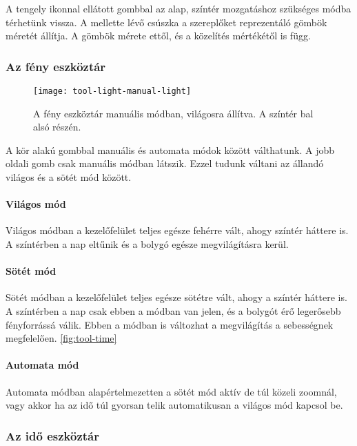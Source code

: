 A tengely ikonnal ellátott gombbal az alap, színtér mozgatáshoz szükséges módba térhetünk vissza. A mellette lévő csúszka a szereplőket reprezentáló gömbök méretét állítja. A gömbök mérete ettől, és a közelítés mértékétől is függ.

\subsubsection{Az fény eszköztár}

\begin{figure}[h!]
	\centering
	\texttt{[image: tool-light-manual-light]}
	\caption{A fény eszköztár manuális módban, világosra állítva. A színtér bal alsó részén.}
	\label{fig:tool-light-manual-light}
\end{figure}

A kör alakú gombbal manuális és automata módok között válthatunk. A jobb oldali gomb csak manuális módban látszik. Ezzel tudunk váltani az állandó világos és a sötét mód között.

\paragraph{Világos mód}

Világos módban a kezelőfelület teljes egésze fehérre vált, ahogy színtér háttere is. A színtérben a nap eltűnik és a bolygó egésze megvilágításra kerül.

\paragraph{Sötét mód}

Sötét módban a kezelőfelület teljes egésze sötétre vált, ahogy a színtér háttere is. A színtérben a nap csak ebben a módban van jelen, és a bolygót érő legerősebb fényforrássá válik. Ebben a módban is változhat a megvilágítás a sebességnek megfelelően. \ref{fig:tool-time}

\paragraph{Automata mód}

Automata módban alapértelmezetten a sötét mód aktív de túl közeli zoomnál, vagy akkor ha az idő túl gyorsan telik automatikusan a világos mód kapcsol be.

\subsubsection{Az idő eszköztár}


